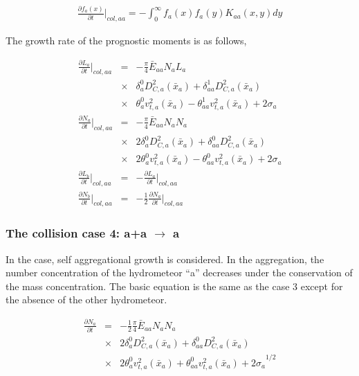 \begin{eqnarray}
\frac{\partial f_{a}(x)}{\partial t}\Bigr|_{col,aa}=-\int_{0}^{\infty}f_{a}(x)f_{a}(y)K_{aa}(x,y)dy\label{sn199}
\end{eqnarray}

The growth rate of the prognostic moments is as follows,

\begin{eqnarray}
\frac{\partial L_{a}}{\partial t}\Bigr|_{col,aa}&=&-\frac{\pi}{4}\bar{E}_{aa}{N_{a}}{L_{a}}\nonumber\\
&\times&{\delta_{a}^{0}D_{C,a}^{2}(\bar{x}_{a})+\delta_{aa}^{1}D_{C,a}^{2}(\bar{x}_{a})}\nonumber\\
&\times&{\theta_{a}^{0}v_{t,a}^{2}(\bar{x}_{a})-\theta_{aa}^{1}v_{t,a}^{2}(\bar{x}_{a})+2\sigma_{a}}\label{sn200}\\
\frac{\partial N_{a}}{\partial t}\Bigr|_{col,aa}&=&-\frac{\pi}{4}\bar{E}_{aa}{N_{a}}{N_{a}}\nonumber\\
&\times&{2\delta_{a}^{0}D_{C,a}^{2}(\bar{x}_{a})+\delta_{aa}^{0}D_{C,a}^{2}(\bar{x}_{a})}\nonumber\\
&\times&{2\theta_{a}^{0}v_{t,a}^{2}(\bar{x}_{a})-\theta_{aa}^{0}v_{t,a}^{2}(\bar{x}_{a})+2\sigma_{a}}\label{sn201}\\
\frac{\partial L_{b}}{\partial t}\Bigr|_{col,aa}&=&-\frac{\partial L_{a}}{\partial t}\Bigr|_{col,aa}\label{sn202}\\
\frac{\partial N_{b}}{\partial t}\Bigr|_{col,aa}&=&-\frac{1}{2}\frac{\partial N_{a}}{\partial t}\Bigr|_{col,aa}\label{sn203}
\end{eqnarray}


\subsubsection{The collision case 4: a+a $\rightarrow$ a}
In the case, self aggregational growth is considered. In the aggregation, the number concentration of the hydrometeor “a” decreases under the conservation of the mass concentration. The basic equation is the same as the case 3 except for the absence of the other hydrometeor.

\begin{eqnarray}
\frac{\partial N_{a}}{\partial t}&=&-\frac{1}{2}\frac{\pi}{4}\bar{E}_{aa}N_{a}N_{a}\nonumber\\
&\times&{2\delta_{a}^{0}D_{C,a}^{2}(\bar{x}_{a})+\delta_{aa}^{0}D_{C,a}^{2}(\bar{x}_{a})}\nonumber\\
&\times&{2\theta_{a}^{0}v_{t,a}^{2}(\bar{x}_{a})+\theta_{aa}^{0}v_{t,a}^{2}(\bar{x}_{a})+2\sigma_{a}}^{1/2}\label{sn204}
\end{eqnarray}

